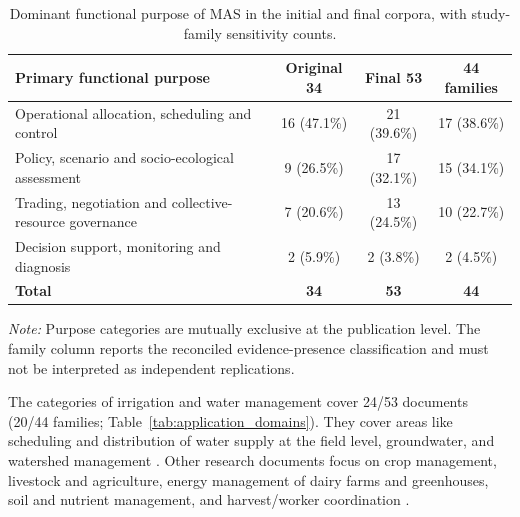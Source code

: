 \documentclass[11pt,a4paper]{article}
\begin{document}
\begin{table}[H]
\centering
\small
\caption{Dominant functional purpose of MAS in the initial
and final corpora, with study-family sensitivity counts.}
\label{tab:rq0_functional_purposes}

\begin{tabularx}{\textwidth}{@{}Xccc@{}}
\toprule

\textbf{Primary functional purpose} &
\textbf{Original 34} &
\textbf{Final 53} &
\textbf{44 families} \\

\midrule

Operational allocation, scheduling and control &
16 (47.1\%) & 21 (39.6\%) & 17 (38.6\%) \\

Policy, scenario and socio-ecological assessment &
9 (26.5\%) & 17 (32.1\%) & 15 (34.1\%) \\

Trading, negotiation and collective-resource governance &
7 (20.6\%) & 13 (24.5\%) & 10 (22.7\%) \\

Decision support, monitoring and diagnosis &
2 (5.9\%) & 2 (3.8\%) & 2 (4.5\%) \\

\midrule

\textbf{Total} & \textbf{34} & \textbf{53} & \textbf{44} \\

\bottomrule
\end{tabularx}

\par\smallskip
\begin{minipage}{\textwidth}
\footnotesize
\emph{Note:} Purpose categories are mutually exclusive
at the publication level. The family column reports
the reconciled evidence-presence classification and
must not be interpreted as independent replications.
\end{minipage}

\end{table}

The categories of irrigation and water management cover 24/53 documents
(20/44 families; Table~\ref{tab:application_domains}). They cover
areas like scheduling and distribution of water supply at the field level,
groundwater, and watershed management \parencite{chiewchan_water_2023,
jimenez_intelligent_2022,feuillette_sinuse_2003}. Other research documents focus on crop management, livestock and agriculture, energy management of dairy farms and greenhouses, soil and nutrient management, and harvest/worker coordination \parencite{catarino_fostering_2021,shah_peer--peer_2024,
harman_multi-agent_2022,grovermann_smart_2017}.
\end{document}

